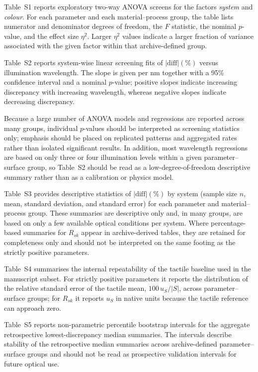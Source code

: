 \documentclass[10pt]{article}
\begin{document}
\medskip
\noindent
Table~S1 reports exploratory two-way ANOVA screens for the factors \emph{system} and \emph{colour}. For each parameter and each material--process group, the table lists numerator and denominator degrees of freedom, the $F$ statistic, the nominal $p$-value, and the effect size $\eta^2$. Larger $\eta^2$ values indicate a larger fraction of variance associated with the given factor within that archive-defined group.

\medskip
\noindent
Table~S2 reports system-wise linear screening fits of $|\mathrm{diff}|(\%)$ versus illumination wavelength. The slope is given per nm together with a 95\% confidence interval and a nominal $p$-value; positive slopes indicate increasing discrepancy with increasing wavelength, whereas negative slopes indicate decreasing discrepancy.

\medskip
\noindent
Because a large number of ANOVA models and regressions are reported across many groups, individual $p$-values should be interpreted as screening statistics only; emphasis should be placed on replicated patterns and aggregated rates rather than isolated significant results. In addition, most wavelength regressions are based on only three or four illumination levels within a given parameter--surface group, so Table~S2 should be read as a low-degree-of-freedom descriptive summary rather than as a calibration or physics model.

\medskip
\noindent
Table~S3 provides descriptive statistics of $|\mathrm{diff}|(\%)$ by system (sample size $n$, mean, standard deviation, and standard error) for each parameter and material--process group. These summaries are descriptive only and, in many groups, are based on only a few available optical conditions per system. Where percentage-based summaries for $R_{sk}$ appear in archive-derived tables, they are retained for completeness only and should not be interpreted on the same footing as the strictly positive parameters.

\medskip
\noindent
Table~S4 summarises the internal repeatability of the tactile baseline used in the manuscript subset. For strictly positive parameters it reports the distribution of the relative standard error of the tactile mean, $100\,u_S/|S|$, across parameter--surface groups; for $R_{sk}$ it reports $u_S$ in native units because the tactile reference can approach zero.

\medskip
\noindent
Table~S5 reports non-parametric percentile bootstrap intervals for the aggregate retrospective lowest-discrepancy median summaries. The intervals describe stability of the retrospective median summaries across archive-defined parameter--surface groups and should not be read as prospective validation intervals for future optical use.
\end{document}
